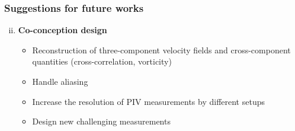 \documentclass{beamer}
\let\olditem\item
\renewcommand{\item}{\setlength{\itemsep}{\fill}\olditem}
\begin{document}
\begin{frame}
\frametitle{Suggestions for future works}
\begin{enumerate}[(i)]
	\setcounter{enumi}{1}
	\item \textbf{Co-conception design}
	\begin{itemize}
		\item Reconstruction of three-component velocity fields and cross-component quantities (cross-correlation, vorticity)
		\item Handle aliasing
		\item Increase the resolution of PIV measurements by different setups
		\item Design new challenging measurements
	\end{itemize}
\end{enumerate}	
\end{frame}
\end{document}
